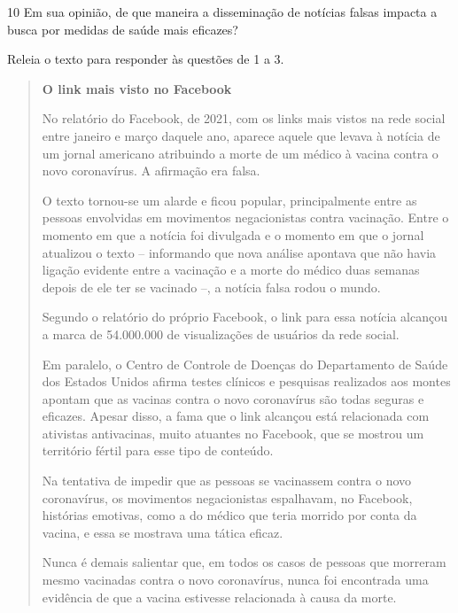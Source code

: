 \num{10} Em sua opinião, de que maneira a disseminação de notícias falsas
impacta a busca por medidas de saúde mais eficazes?



Releia o texto para responder às questões de 1 a 3.

\begin{quote}
\textbf{O link mais visto no Facebook}

No relatório do Facebook, de 2021, com os links mais vistos na rede social
entre janeiro e março daquele ano, aparece aquele que levava à notícia
de um jornal americano atribuindo a morte de um médico à vacina contra
o novo coronavírus. A afirmação era falsa.

O texto tornou-se um alarde e ficou popular, principalmente entre as pessoas
envolvidas em movimentos negacionistas contra vacinação. Entre o momento em
que a notícia foi divulgada e o momento em que o jornal atualizou o texto --
informando que nova análise apontava que não havia ligação evidente entre a
vacinação e a morte do médico duas semanas depois de ele ter se vacinado --,
a notícia falsa rodou o mundo.

Segundo o relatório do próprio Facebook, o link para essa notícia alcançou
a marca de 54.000.000 de visualizações de usuários da rede social.


Em paralelo, o Centro de Controle de Doenças do Departamento de Saúde dos Estados
Unidos afirma testes clínicos e pesquisas realizados aos montes apontam que as
vacinas contra o novo coronavírus são todas seguras e eficazes. Apesar disso, a
fama que o link alcançou está relacionada com ativistas antivacinas, muito atuantes
no Facebook, que se mostrou um território fértil para esse tipo de conteúdo.

Na tentativa de impedir que as pessoas se vacinassem contra o novo coronavírus,
os movimentos negacionistas espalhavam, no Facebook, histórias emotivas, como
a do médico que teria morrido por conta da vacina, e essa se mostrava uma
tática eficaz.

Nunca é demais salientar que, em todos os casos de pessoas que morreram
mesmo vacinadas contra o novo coronavírus, nunca foi encontrada uma evidência
de que a vacina estivesse relacionada à causa da morte.

\end{quote}


